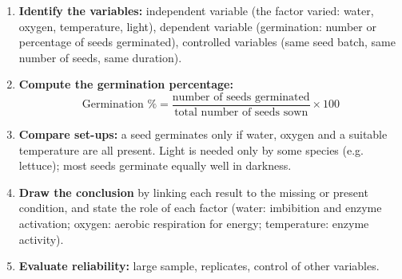 \documentclass[11pt]{article}
\newcommand{\cle}[1]{{\popxbold\color{popdark}#1}}
\begin{document}
\begin{methode}
\begin{enumerate}
\item \textbf{Identify the variables:} independent variable (the factor varied: water, oxygen, temperature, light), dependent variable (germination: number or percentage of seeds germinated), controlled variables (same seed batch, same number of seeds, same duration).
\item \textbf{Compute the germination percentage:}
\[ \text{Germination \%} = \frac{\text{number of seeds germinated}}{\text{total number of seeds sown}} \times 100 \]
\item \textbf{Compare set-ups:} a seed germinates only if \cle{water}, \cle{oxygen} and a \cle{suitable temperature} are all present. Light is needed only by some species (e.g. lettuce); most seeds germinate equally well in darkness.
\item \textbf{Draw the conclusion} by linking each result to the missing or present condition, and state the role of each factor (water: imbibition and enzyme activation; oxygen: aerobic respiration for energy; temperature: enzyme activity).
\item \textbf{Evaluate reliability:} large sample, replicates, control of other variables.
\end{enumerate}
\end{methode}
\end{document}
